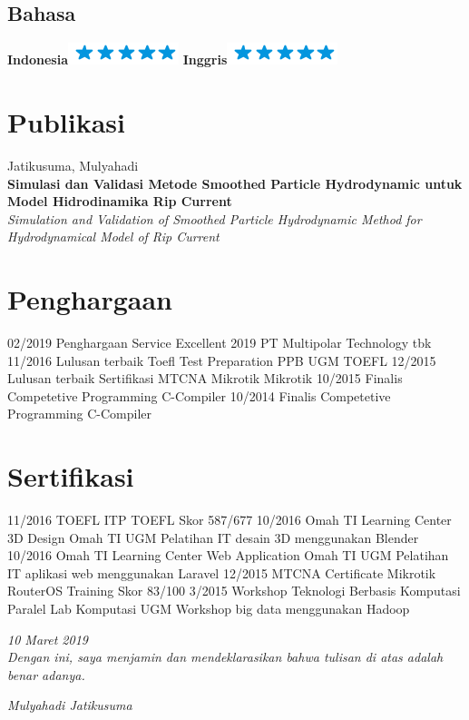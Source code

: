 \documentclass[]{friggeri-cv}
\begin{document}
\begin{aside}
  \section{Bahasa}
    \textbf{Indonesia}\includegraphics[scale=0.40]{img/5stars.png}
    \textbf{Inggris}\includegraphics[scale=0.40]{img/5stars.png}
    ~
\end{aside}

\section{Publikasi}
Jatikusuma, Mulyahadi\\
\textbf{Simulasi dan Validasi Metode Smoothed Particle Hydrodynamic untuk Model Hidrodinamika Rip Current}\\
\emph{Simulation and Validation of Smoothed Particle Hydrodynamic Method for Hydrodynamical Model of Rip Current}
\\

\section{Penghargaan}
\begin{entrylist}
  \entry
	{02/2019}
    {Penghargaan Service Excellent 2019}
    {PT Multipolar Technology tbk}
	{}
  \entry
	{11/2016}
    {Lulusan terbaik Toefl Test Preparation PPB UGM}
    {TOEFL}
	{}
  \entry
    {12/2015}
    {Lulusan terbaik Sertifikasi MTCNA Mikrotik}
    {Mikrotik}
    {}
  \entry
    {10/2015}
    {Finalis Competetive Programming}
    {C-Compiler}
    {}
  \entry
    {10/2014}
    {Finalis Competetive Programming}
    {C-Compiler}
    {}
\end{entrylist}

\section{Sertifikasi}
\begin{entrylist}
  \entry
    {11/2016}
    {TOEFL ITP}
    {TOEFL}
    {Skor 587/677}
  \entry
    {10/2016}
    {Omah TI Learning Center 3D Design}
    {Omah TI UGM}
    {Pelatihan IT desain 3D menggunakan Blender}
  \entry
    {10/2016}
    {Omah TI Learning Center Web Application}
    {Omah TI UGM}
    {Pelatihan IT aplikasi web menggunakan Laravel}
  \entry
    {12/2015}
    {MTCNA Certificate}
    {Mikrotik RouterOS Training}
    {Skor 83/100}
  \entry
	{3/2015}
	{Workshop Teknologi Berbasis Komputasi Paralel}
	{Lab Komputasi UGM}
	{Workshop big data menggunakan Hadoop}
\end{entrylist}

\begin{flushleft}
\emph{10 Maret 2019}\\
\emph{Dengan ini, saya menjamin dan mendeklarasikan bahwa tulisan di atas adalah benar adanya.}
\end{flushleft}
\begin{flushright}
\emph{Mulyahadi Jatikusuma}
\end{flushright}
\end{document}
